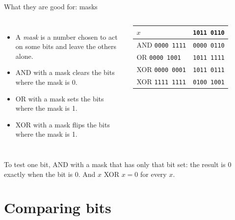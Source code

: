 \documentclass[10pt]{wosm-slides}
\newcommand*\byte[2]{\texttt{#1\,#2}}
\begin{document}
\begin{frame}{What they are good for: masks}
  \begin{columns}[T, totalwidth=\textwidth]
      \begin{itemize}
        \item A \emph{mask} is a number chosen to act on some bits and leave the
          others alone.
        \item AND with a mask \alert{clears} the bits where the mask is 0.
        \item OR with a mask \alert{sets} the bits where the mask is 1.
        \item XOR with a mask \alert{flips} the bits where the mask is 1.
      \end{itemize}
      \centering
      \begin{tabular}{@{}lc@{}}
        $x$ & \byte{1011}{0110} \\
        \midrule
        AND \byte{0000}{1111} & \byte{0000}{0110} \\
        OR \phantom{N}\byte{0000}{1001} & \byte{1011}{1111} \\
        XOR \byte{0000}{0001} & \byte{1011}{0111} \\
        XOR \byte{1111}{1111} & \byte{0100}{1001} \\
      \end{tabular}\par\medskip
  \end{columns}

  \begin{remark}
    To test one bit, AND with a mask that has only that bit set: the result is 0
    exactly when the bit is 0. And $x$ XOR $x = 0$ for every $x$.
  \end{remark}
\end{frame}

\section{Comparing bits}
\end{document}
